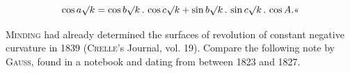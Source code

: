 \[
\cos a\mathord{\surd}k = \cos b\mathord{\surd}k \,.\, \cos c\mathord{\surd}k + \sin b\mathord{\surd}k \,.\, \sin c\mathord{\surd}k \,.\, \cos A.\text{«}
\]

\textsc{Minding} had already determined the surfaces of revolution of constant negative curvature in 1839 (\textsc{Crelle}'s Journal, vol. 19). Compare the following note by \textsc{Gauss}, found in a notebook and dating from between 1823 and 1827.
